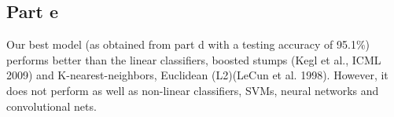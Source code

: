\documentclass{article}      %
\begin{document}
\subsection{Part e}

Our best model (as obtained from part d with a testing accuracy of 95.1\%) performs better than the linear classifiers, boosted stumps (Kegl et al., ICML 2009) and K-nearest-neighbors, Euclidean (L2)(LeCun et al. 1998). However, it does not perform as well as non-linear classifiers, SVMs, neural networks and convolutional nets.



%
\end{document}
